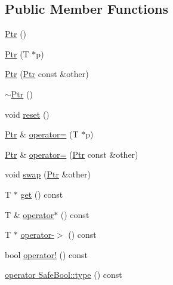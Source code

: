 \subsection*{Public Member Functions}
\begin{DoxyCompactItemize}
\item 
\hyperlink{class_catch_1_1_ptr_a6108f0195595ee9d7a411daea810beaf}{Ptr} ()
\item 
\hyperlink{class_catch_1_1_ptr_aacec063a79cd142e39040a31c6b3c40b}{Ptr} (T $\ast$p)
\item 
\hyperlink{class_catch_1_1_ptr_ac629dd8ebe5763a37bb89e6c1d6a1771}{Ptr} (\hyperlink{class_catch_1_1_ptr}{Ptr} const \&other)
\item 
\hyperlink{class_catch_1_1_ptr_ac96d3bb33adcfb983207385cfba5fe8a}{$\sim$\-Ptr} ()
\item 
void \hyperlink{class_catch_1_1_ptr_af8d0fa7a2cd20842830b354ac31dfe5c}{reset} ()
\item 
\hyperlink{class_catch_1_1_ptr}{Ptr} \& \hyperlink{class_catch_1_1_ptr_a9b08c868b447d679ed201921f5c94683}{operator=} (T $\ast$p)
\item 
\hyperlink{class_catch_1_1_ptr}{Ptr} \& \hyperlink{class_catch_1_1_ptr_af42074444c1bc6a70ebdc406a8617708}{operator=} (\hyperlink{class_catch_1_1_ptr}{Ptr} const \&other)
\item 
void \hyperlink{class_catch_1_1_ptr_a172bf8b4e71e26a5a4d92f5b02158b50}{swap} (\hyperlink{class_catch_1_1_ptr}{Ptr} \&other)
\item 
T $\ast$ \hyperlink{class_catch_1_1_ptr_a1617aa5ff058b53ea572cf965617b7ae}{get} () const 
\item 
T \& \hyperlink{class_catch_1_1_ptr_a3a4c139032a8bd1bffa553103d5dbfd3}{operator$\ast$} () const 
\item 
T $\ast$ \hyperlink{class_catch_1_1_ptr_afaa13250d5e0ae5a440726d5e5aa7295}{operator-\/$>$} () const 
\item 
bool \hyperlink{class_catch_1_1_ptr_aea1a99ded6d62423ccb9173fab91b56e}{operator!} () const 
\item 
\hyperlink{class_catch_1_1_ptr_a27234c04feec43ffe0fd08e045557448}{operator Safe\-Bool\-::type} () const 
\end{DoxyCompactItemize}


